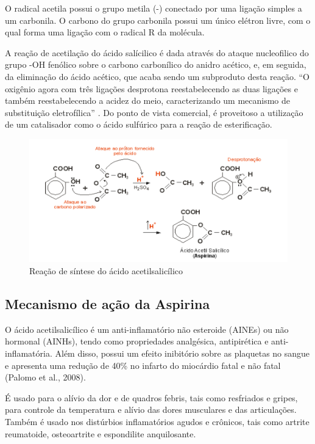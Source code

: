 O radical acetila possui o grupo metila (-) conectado por uma ligação simples a um carbonila. O
carbono do grupo carbonila possui um único elétron livre, com o qual forma uma ligação com o radical R da
molécula.

A reação de acetilação do ácido salícilico é dada através do ataque nucleofilico do grupo -OH fenólico
sobre o carbono carbonílico do anidro acético, e, em seguida, da eliminação do ácido acético, que acaba
sendo um subproduto desta reação. “O oxigênio agora com três ligações desprotona reestabelecendo as duas
ligações e também reestabelecendo a acidez do meio, caracterizando um mecanismo de substituição
eletrofílica” \cite{lopes2011}. Do ponto de vista comercial, é proveitoso a utilização de um catalisador
como o ácido sulfúrico para a reação de esterificação. \cite{PERUCH2013}

\begin{figure}[H]
\begin{center}
    \includegraphics[width=1.2\textwidth]{figuras/im2.png}
\end{center}
\caption{Reação de síntese do ácido acetilsalicílico}\label{fig:im2}%
\end{figure}

\subsection{Mecanismo de ação da Aspirina}

 O ácido acetilsalicílico é um anti-inflamatório não esteroide (AINEs) ou não hormonal (AINHs), tendo como       propriedades analgésica, antipirética e anti-inflamatória. Além disso, possui um efeito inibitório sobre
as plaquetas no sangue e apresenta uma redução de 40\% no infarto do miocárdio fatal e não fatal (Palomo
et al., 2008).

É usado para o alívio da dor e de quadros febris, tais como resfriados e gripes, para controle da
temperatura e alívio das dores musculares e das articulações. Também é usado nos distúrbios inflamatórios
agudos e crônicos, tais como artrite reumatoide, osteoartrite e espondilite
anquilosante.\cite{bulaaspirina}


